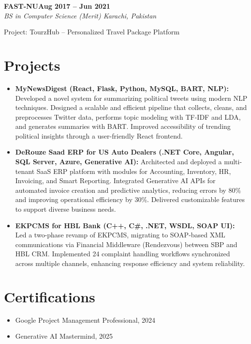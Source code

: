 \documentclass[letterpaper,10pt]{article}
\newcommand{\headingBf}[2]{
  \hspace{10pt}\textbf{#1}\hfill\textbf{#2}\\
}
\newcommand{\headingIt}[2]{
  \hspace{10pt}\textit{#1}\hfill\textit{#2}\\
}
\newenvironment{resume_list}{
  \vspace{-7pt}
  \begin{itemize}[itemsep=-2px, parsep=1pt, leftmargin=30pt]
}{
  \end{itemize}
}
\begin{document}
\headingBf{FAST-NU}{Aug 2017 -- Jun 2021}
\headingIt{BS in Computer Science (Merit) \hfill Karachi, Pakistan}{}
\begin{resume_list}
    \item Project: TourzHub -- Personalized Travel Package Platform
\end{resume_list}

\section{Projects}
\begin{itemize}
    \setlength\itemsep{3pt}
    \item \textbf{MyNewsDigest (React, Flask, Python, MySQL, BART, NLP):} Developed a novel system for summarizing political tweets using modern NLP techniques. Designed a scalable and efficient pipeline that collects, cleans, and preprocesses Twitter data, performs topic modeling with TF-IDF and LDA, and generates summaries with BART. Improved accessibility of trending political insights through a user-friendly React frontend.
    \item \textbf{DeRouze Saad ERP for US Auto Dealers (.NET Core, Angular, SQL Server, Azure, Generative AI): } Architected and deployed a multi-tenant SaaS ERP platform with modules for Accounting, Inventory, HR, Invoicing, and Smart Reporting. Integrated Generative AI APIs for automated invoice creation and predictive analytics, reducing errors by 80\% and improving operational efficiency by 30\%. Delivered customizable features to support diverse business needs.
    \item \textbf{EKPCMS for HBL Bank (C++, C\#, .NET, WSDL, SOAP UI):} Led a two-phase revamp of EKPCMS, migrating to SOAP-based XML communications via Financial Middleware (Rendezvous) between SBP and HBL CRM. Implemented 24 complaint handling workflows synchronized across multiple channels, enhancing response efficiency and system reliability.
\end{itemize}

\section{Certifications}
\begin{itemize}
    \item Google Project Management Professional, 2024
    \item Generative AI Mastermind, 2025
\end{itemize}

\vspace*{\fill}
\end{document}
